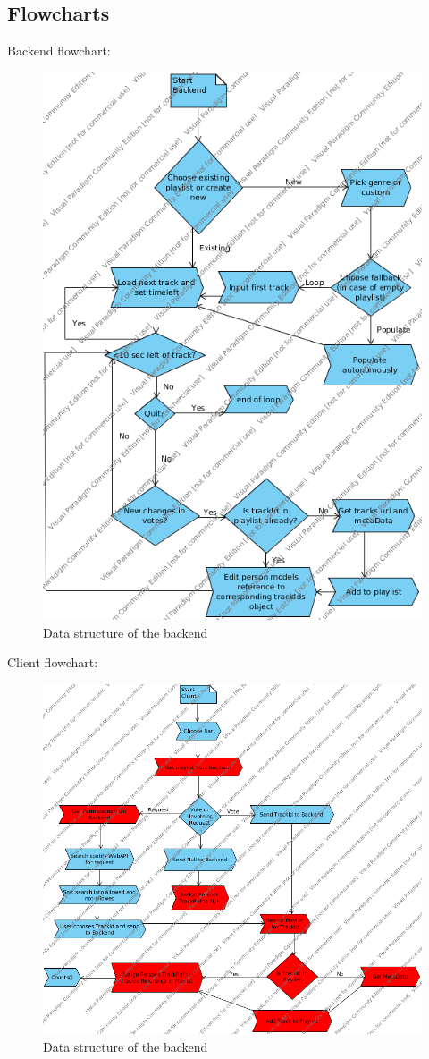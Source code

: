 \subsection{Flowcharts}

Backend flowchart:
\begin{figure}
  \centering
  \includegraphics[width=0.5\linewidth]{Images/backendFlowchart.png}
  \caption{Data structure of the backend}
  \label{fig:backendFlowchart}
\end{figure}

Client flowchart:

\begin{figure}
  \centering
  \includegraphics[width=0.5\linewidth]{Images/clientFlowchart.png}
  \caption{Data structure of the backend}
  \label{fig:clientFlowchart}
\end{figure}